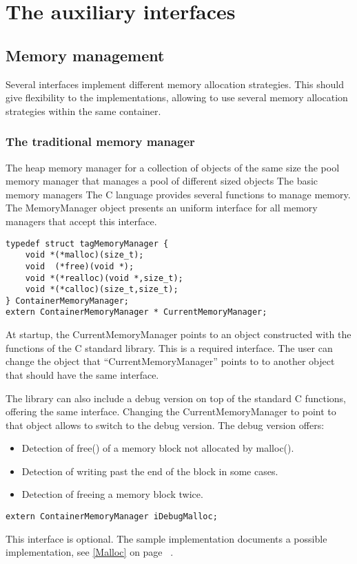 \documentclass[12pt,a4paper]{memoir} %
\newcommand{\See}[1]{%
see \ref{#1} on page~\pageref{#1}
}
\begin{document}
\chapter{The auxiliary interfaces}
\section{Memory management}
Several interfaces implement different memory allocation strategies. This should give flexibility to the implementations, allowing to use several memory allocation strategies within the same container.
\subsection{The traditional memory manager}
The heap memory manager for a collection of objects of the same size
the pool memory manager that manages a pool of different sized objects
The basic memory managers
The C language provides several functions to manage memory. The MemoryManager object presents an uniform interface for all memory managers that accept this interface.
\begin{verbatim}
typedef struct tagMemoryManager {
    void *(*malloc)(size_t);
    void  (*free)(void *);
    void *(*realloc)(void *,size_t);
    void *(*calloc)(size_t,size_t);
} ContainerMemoryManager;
extern ContainerMemoryManager * CurrentMemoryManager;
\end{verbatim}
At startup, the CurrentMemoryManager points to an object constructed with the functions of the C standard library. This is a required interface.
The user can change the object that “CurrentMemoryManager” points to to another object that should have the same interface.

The library can also include a debug version on top of the standard C functions, offering the same interface. Changing the CurrentMemoryManager to point to that object allows to switch to the debug version. The debug version offers:
\begin{itemize}
\item
Detection of free() of a memory block not allocated by malloc().
\item
Detection of  writing past the end of the block in some cases.
\item
Detection of freeing a memory block twice.
\end{itemize}
\begin{verbatim}
extern ContainerMemoryManager iDebugMalloc;
\end{verbatim}
This interface is optional. The sample implementation documents a possible implementation, \See{Malloc}.
\end{document}

